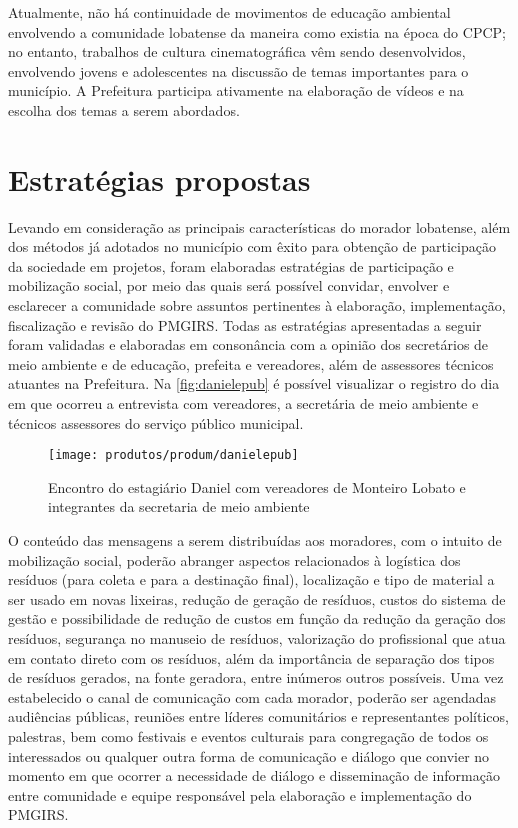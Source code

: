 Atualmente, não há continuidade de movimentos de educação ambiental envolvendo a comunidade lobatense da maneira como existia na época do CPCP; no entanto, trabalhos de cultura cinematográfica vêm sendo desenvolvidos, envolvendo jovens e adolescentes na discussão de temas importantes para o município. A Prefeitura participa ativamente na elaboração de vídeos e na escolha dos temas a serem abordados. 

\section{Estratégias propostas}

Levando em consideração as principais características do morador lobatense, além dos métodos já adotados no município com êxito para obtenção de participação da sociedade em projetos, foram elaboradas estratégias de participação e mobilização social, por meio das quais será possível convidar, envolver e esclarecer a comunidade sobre assuntos pertinentes à elaboração, implementação, fiscalização e revisão do PMGIRS. Todas as estratégias apresentadas a seguir foram validadas e elaboradas em consonância com a opinião dos secretários de meio ambiente e de educação, prefeita e vereadores, além de assessores técnicos atuantes na Prefeitura. Na \autoref{fig:danielepub} é possível visualizar o registro do dia em que ocorreu a entrevista com vereadores, a secretária de meio ambiente e técnicos assessores do serviço público municipal.

\begin{figure}
	\centering
	\texttt{[image: produtos/produm/danielepub]}
	\caption{Encontro do estagiário Daniel com vereadores de Monteiro Lobato e integrantes da secretaria de meio ambiente}
	\label{fig:danielepub}
\end{figure}

O conteúdo das mensagens a serem distribuídas aos moradores, com o intuito de mobilização social, poderão abranger aspectos relacionados à logística dos resíduos (para coleta e para a destinação final), localização e tipo de material a ser usado em novas lixeiras, redução de geração de resíduos, custos do sistema de gestão e possibilidade de redução de custos em função da redução da geração dos resíduos, segurança no manuseio de resíduos, valorização do profissional que atua em contato direto com os resíduos, além da importância de separação dos tipos de resíduos gerados, na fonte geradora, entre inúmeros outros possíveis. Uma vez estabelecido o canal de comunicação com cada morador, poderão ser agendadas audiências públicas, reuniões entre líderes comunitários e representantes políticos, palestras, bem como festivais e eventos culturais para congregação de todos os interessados ou qualquer outra forma de comunicação e diálogo que convier no momento em que ocorrer a necessidade de diálogo e disseminação de informação entre comunidade e equipe responsável pela elaboração e implementação do PMGIRS.

